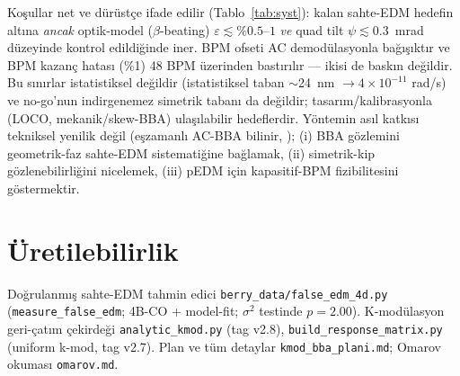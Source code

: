 \documentclass[twocolumn,a4paper,10pt]{article}
\begin{document}
Koşullar net ve dürüstçe ifade edilir (Tablo~\ref{tab:syst}): kalan sahte-EDM
hedefin altına \emph{ancak} optik-model ($\beta$-beating) $\varepsilon \lesssim
\%0.5$--$1$ \emph{ve} quad tilt $\psi \lesssim 0.3$~mrad düzeyinde
kontrol edildiğinde iner. BPM ofseti AC demodülasyonla bağışıktır ve BPM kazanç
hatası (\%1) 48 BPM üzerinden bastırılır --- ikisi de baskın değildir. Bu
sınırlar istatistiksel değildir (istatistiksel taban $\sim$24~nm $\to
4\times10^{-11}$ rad/s) ve no-go'nun indirgenemez simetrik tabanı da değildir;
tasarım/kalibrasyonla (LOCO, mekanik/skew-BBA) ulaşılabilir hedeflerdir. Yöntemin asıl katkısı tekniksel yenilik değil
(eşzamanlı AC-BBA bilinir, \cite{huang2022}); (i) BBA gözlemini geometrik-faz
sahte-EDM sistematiğine bağlamak, (ii) simetrik-kip gözlenebilirliğini nicelemek,
(iii) pEDM için kapasitif-BPM fizibilitesini göstermektir.

\section*{Üretilebilirlik}
Doğrulanmış sahte-EDM tahmin edici \texttt{berry\_data/false\_edm\_4d.py}
(\texttt{measure\_false\_edm}; 4B-CO + model-fit; $\sigma^2$ testinde $p=2.00$).
K-modülasyon geri-çatım çekirdeği \texttt{analytic\_kmod.py} (tag v2.8),
\texttt{build\_response\_matrix.py} (uniform k-mod, tag v2.7). Plan ve tüm
detaylar \texttt{kmod\_bba\_plani.md}; Omarov okuması \texttt{omarov.md}.
\end{document}

